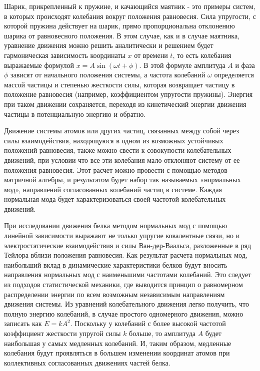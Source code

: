 Шарик, прикрепленный к пружине, и качающийся маятник - это примеры систем, в которых происходят колебания вокруг положения равновесия. Сила упругости, с которой пружина действует на шарик, прямо пропорциональна отклонению шарика от равновесного положения. В этом случае, как и в случае маятника, уравнение движения можно решить аналитически и решением будет гармоническая зависимость координаты $x$ от времени $t$, то есть колебания выражаемые формулой $x=A\sin(\omega t + \phi)$. В этой формуле амплитуда $A$ и фаза $\phi$ зависят от начального положения системы, а частота колебаний $\omega$ определяется массой частицы и степенью жесткости силы, которая возвращает частицу в положение равновесия (например, коэффициентом упругости пружины). Энергия при таком движении сохраняется, переходя из кинетический энергии движения частицы в потенциальную энергию и обратно.

Движение системы атомов или других частиц, связанных между собой через силы взаимодействия, находящуюся в одном из возможных устойчивых положений равновесия, также можно свести к совокупости колебательных движений, при условии что все эти колебания мало отклоняют систему от ее положения равновесия. Этот расчет можно провести с помощью методов матричной алгебры, и результатом будет набор так называемых «нормальных мод», направлений согласованных колебаний частиц в системе. Каждая нормальная мода будет характеризоваться своей частотой колебательных движений. 

При исследовании движения белка методом нормальных мод с помощью линейной зависимости выражают не только упругие ковалентные связи, но и электростатические взаимодействия и силы Ван-дер-Ваальса, разложенные в ряд Тейлора вблизи положения равновесия. Как результат  расчета нормальных мод, наибольший вклад в динамические характеристики белков будут вносить направления нормальных мод с наименьшими частотами колебаний. Это следует из подходов статистической механики, где выводится принцип о равномерном распределении энергии по всем возможным независимым направлениям движения системы. Из уравнений колебательного движения легко получить, что полную энергию колебаний, в случае простого одномерного движения, можно записать как $E=kA^2$. Поскольку у колебаний с более высокой частотой коэффициент жесткости упругой силы $k$ больше, то амплитуда $A$ будет наибольшая у самых медленных колебаний. И, таким образом, медленные колебания будут проявляться в большем изменении координат атомов при коллективных согласованных движениях частей белка. 

